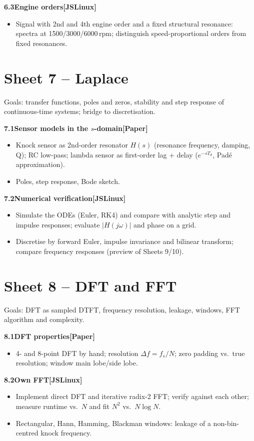 \documentclass[11pt,a4paper]{article}
\newcommand{\J}{\textsf{\textbf{[JSLinux]}}}
\newcommand{\Pap}{\textsf{\textbf{[Paper]}}}
\newcommand{\exercise}[4]{%
  \par\smallskip\noindent\textbf{#1\quad #2}\hfill#3\par
  \nopagebreak\begin{itemize}[leftmargin=1.2em]#4\end{itemize}}
\begin{document}
\exercise{6.3}{Engine orders}{\J}{
  \item Signal with 2nd and 4th engine order and a fixed structural
    resonance: spectra at 1500/3000/6000\,rpm; distinguish
    speed-proportional orders from fixed resonances.}

\section{Sheet 7 -- Laplace}
\begin{sheetinfo}
Goals: transfer functions, poles and zeros, stability and step response
of continuous-time systems; bridge to discretisation.
\end{sheetinfo}

\exercise{7.1}{Sensor models in the $s$-domain}{\Pap}{
  \item Knock sensor as 2nd-order resonator $H(s)$ (resonance frequency,
    damping, Q); RC low-pass; lambda sensor as first-order lag + delay
    ($e^{-sT_d}$, Pad\'e approximation).
  \item Poles, step response, Bode sketch.}

\exercise{7.2}{Numerical verification}{\J}{
  \item Simulate the ODEs (Euler, RK4) and compare with analytic step and
    impulse responses; evaluate $|H(j\omega)|$ and phase on a grid.
  \item Discretise by forward Euler, impulse invariance and bilinear
    transform; compare frequency responses (preview of Sheets 9/10).}

\section{Sheet 8 -- DFT and FFT}
\begin{sheetinfo}
Goals: DFT as sampled DTFT, frequency resolution, leakage, windows,
FFT algorithm and complexity.
\end{sheetinfo}

\exercise{8.1}{DFT properties}{\Pap}{
  \item 4- and 8-point DFT by hand; resolution $\Delta f=f_s/N$; zero
    padding vs.\ true resolution; window main lobe/side lobe.}

\exercise{8.2}{Own FFT}{\J}{
  \item Implement direct DFT and iterative radix-2 FFT; verify against each
    other; measure runtime vs.\ $N$ and fit $N^2$ vs.\ $N\log N$.
  \item Rectangular, Hann, Hamming, Blackman windows: leakage of a
    non-bin-centred knock frequency.}
\end{document}
